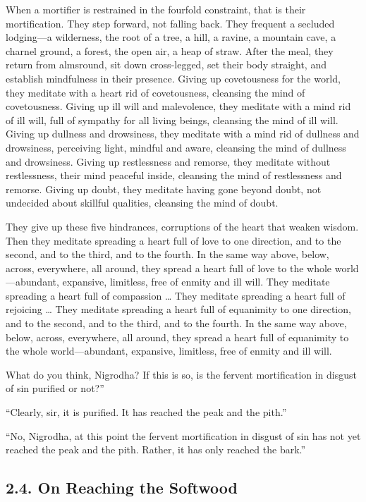 \documentclass[12pt,openany]{book}%
\begin{document}
When a mortifier is restrained in the fourfold constraint, that is their mortification. They step forward, not falling back. They frequent a secluded lodging—a wilderness, the root of a tree, a hill, a ravine, a mountain cave, a charnel ground, a forest, the open air, a heap of straw. After the meal, they return from almsround, sit down cross-legged, set their body straight, and establish mindfulness in their presence. Giving up covetousness for the world, they meditate with a heart rid of covetousness, cleansing the mind of covetousness. Giving up ill will and malevolence, they meditate with a mind rid of ill will, full of sympathy for all living beings, cleansing the mind of ill will. Giving up dullness and drowsiness, they meditate with a mind rid of dullness and drowsiness, perceiving light, mindful and aware, cleansing the mind of dullness and drowsiness. Giving up restlessness and remorse, they meditate without restlessness, their mind peaceful inside, cleansing the mind of restlessness and remorse. Giving up doubt, they meditate having gone beyond doubt, not undecided about skillful qualities, cleansing the mind of doubt. 

They give up these five hindrances, corruptions of the heart that weaken wisdom. Then they meditate spreading a heart full of love to one direction, and to the second, and to the third, and to the fourth. In the same way above, below, across, everywhere, all around, they spread a heart full of love to the whole world—abundant, expansive, limitless, free of enmity and ill will. They meditate spreading a heart full of compassion … They meditate spreading a heart full of rejoicing … They meditate spreading a heart full of equanimity to one direction, and to the second, and to the third, and to the fourth. In the same way above, below, across, everywhere, all around, they spread a heart full of equanimity to the whole world—abundant, expansive, limitless, free of enmity and ill will. 

What do you think, Nigrodha? If this is so, is the fervent mortification in disgust of sin purified or not?” 

“Clearly, sir, it is purified. It has reached the peak and the pith.” 

“No, Nigrodha, at this point the fervent mortification in disgust of sin has not yet reached the peak and the pith. Rather, it has only reached the bark.” 

\subsection*{2.4. On Reaching the Softwood }
\end{document}
